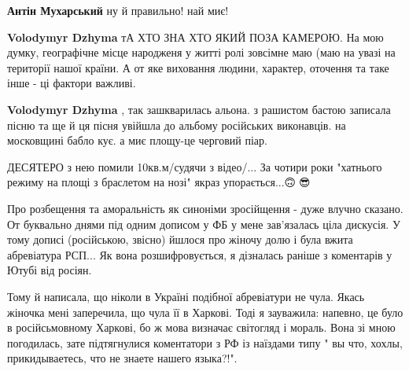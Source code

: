 \begin{itemize}
\begin{itemize}
\textbf{Антін Мухарський} ну й правильно! най миє!

 
\textbf{Volodymyr Dzhyma} тА ХТО ЗНА ХТО ЯКИЙ ПОЗА КАМЕРОЮ. На мою думку, географічне місце народженя у житті ролі зовсімне маю (маю на увазі на території нашої країни. А от яке виховання людини, характер, оточення та таке інше - ці фактори важливі.

 
\textbf{Volodymyr Dzhyma} , так зашкварилась альона. з рашистом бастою записала пісню та ще й ця пісня увійшла до альбому російських виконавців. на московщині бабло кує.
а миє площу-це черговий піар.

 
ДЕСЯТЕРО з нею помили 10кв.м/судячи з відео/... За чотири роки "хатнього режиму
на площі з браслетом на нозі" якраз упорається...🙃🌺😎
\end{itemize}

 

Про розбещення та аморальність як синоніми зросійщення - дуже влучно сказано.
От буквально днями під одним дописом у ФБ у мене зав'язалась ціла дискусія. У
тому дописі (російською, звісно) йшлося про жіночу долю і була вжита
абревіатура РСП... Як вона розшифровується, я дізналась раніше з коментарів у
Ютубі від росіян.

Тому й написала, що ніколи в Україні подібної абревіатури не чула. Якась
жіночка мені заперечила, що чула її в Харкові. Тоді я зауважила: напевно, це
було в російсьмовному Харкові, бо ж мова визначає світогляд і мораль. Вона зі
мною погодилась, зате підтягнулися коментатори з РФ із наїздами типу " вы что,
хохлы, прикидываетесь, что не знаете нашего языка?!".


\end{itemize}
